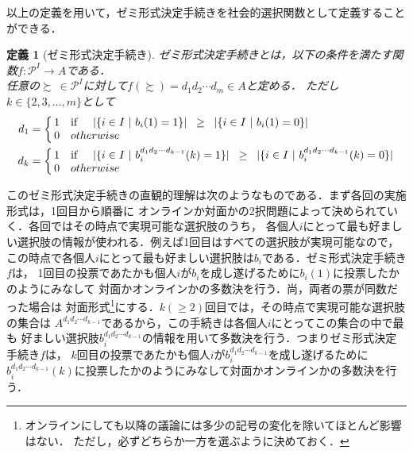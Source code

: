 \documentclass[dvipdfmx]{jsarticle}
\newtheorem{definition}{定義}
\begin{document}
以上の定義を用いて，ゼミ形式決定手続きを社会的選択関数として定義することができる．
\begin{definition}[ゼミ形式決定手続き]\label{def:ゼミ形式決定手続き}
  ゼミ形式決定手続きとは，以下の条件を満たす関数$f\colon \mathcal{P}^I \to A$である．\\
  任意の$\succsim \ \in \mathcal{P}^I$に対して$f(\succsim) = d_{1}d_{2}\cdots d_{m} \in A$と定める．
  ただし$k \in \{2,3,\ldots,m\}$として
  \begin{align*}
      d_{1}
    &= \left\{ \begin{array}{@{\,}rl@{}}
      1 & \mbox{if}\hspace{5mm}  |\{i \in I\ |\ b_i(1) = 1\}| \hspace{2mm} \geq \hspace{2mm} |\{i \in I\ |\ b_i(1) = 0\}| \\
      0 & otherwise
    \end{array} \right. \\
      d_{k}
    &= \left\{ \begin{array}{@{\,}rl@{}}
      1 & \mbox{if}\hspace{5mm}  |\{i \in I\ |\ b_i^{d_{1}d_{2}\cdots d_{k-1}}(k) = 1\}| \hspace{2mm}
      \geq \hspace{2mm} |\{i \in I\ |\ b_i^{d_{1}d_{2}\cdots d_{k-1}}(k) = 0\}| \\
      0 & otherwise
    \end{array} \right.
  \end{align*}
\end{definition}

このゼミ形式決定手続きの直観的理解は次のようなものである．まず各回の実施形式は，1回目から順番に
オンラインか対面かの2択問題によって決められていく．各回ではその時点で実現可能な選択肢のうち，
各個人$i$にとって最も好ましい選択肢の情報が使われる．例えば1回目はすべての選択肢が実現可能なので，
この時点で各個人$i$にとって最も好ましい選択肢は$b_i$である．ゼミ形式決定手続き$f$は，
1回目の投票であたかも個人$i$が$b_i$を成し遂げるために$b_{i}(1)$に投票したかのようにみなして
対面かオンラインかの多数決を行う．尚，両者の票が同数だった場合は
対面形式\footnote{オンラインにしても以降の議論には多少の記号の変化を除いてほとんど影響はない．
ただし，必ずどちらか一方を選ぶように決めておく．}にする．$k(\geq 2)$回目では，その時点で実現可能な選択肢の集合は
$A^{d_{1}d_{2}\cdots d_{k-1}}$であるから，この手続きは各個人$i$にとってこの集合の中で最も
好ましい選択肢$b_i^{d_{1}d_{2}\cdots d_{k-1}}$の情報を用いて多数決を行う．つまりゼミ形式決定手続き$f$は，
$k$回目の投票であたかも個人$i$が$b_i^{d_{1}d_{2}\cdots d_{k-1}}$を成し遂げるために
$b_i^{d_{1}d_{2}\cdots d_{k-1}}(k)$に投票したかのようにみなして対面かオンラインかの多数決を行う．
\end{document}
